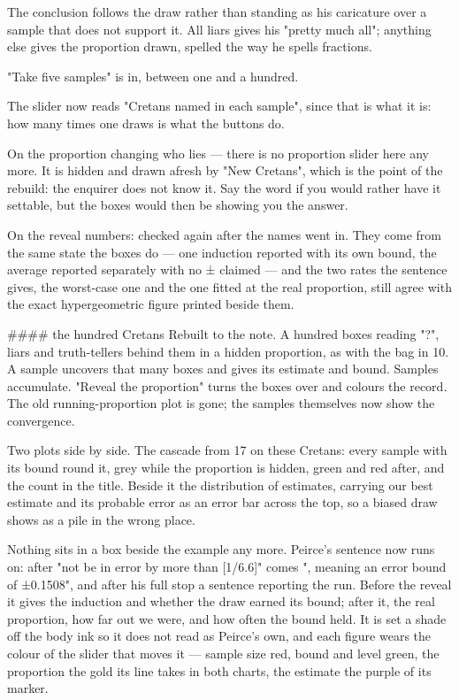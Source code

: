 The conclusion follows the draw rather than standing as his caricature over a
sample that does not support it. All liars gives his "pretty much all"; anything
else gives the proportion drawn, spelled the way he spells fractions.

"Take five samples" is in, between one and a hundred.

The slider now reads "Cretans named in each sample", since that is what it is:
how many times one draws is what the buttons do.

On the proportion changing who lies — there is no proportion slider here any
more. It is hidden and drawn afresh by "New Cretans", which is the point of the
rebuild: the enquirer does not know it. Say the word if you would rather have it
settable, but the boxes would then be showing you the answer.

On the reveal numbers: checked again after the names went in. They come from the
same state the boxes do — one induction reported with its own bound, the average
reported separately with no ± claimed — and the two rates the sentence gives,
the worst-case one and the one fitted at the real proportion, still agree with
the exact hypergeometric figure printed beside them.

#### the hundred Cretans
Rebuilt to the note. A hundred boxes reading "?", liars and truth-tellers behind
them in a hidden proportion, as with the bag in 10. A sample uncovers that many
boxes and gives its estimate and bound. Samples accumulate. "Reveal the
proportion" turns the boxes over and colours the record. The old
running-proportion plot is gone; the samples themselves now show the
convergence.

Two plots side by side. The cascade from 17 on these Cretans: every sample with
its bound round it, grey while the proportion is hidden, green and red after,
and the count in the title. Beside it the distribution of estimates, carrying
our best estimate and its probable error as an error bar across the top, so a
biased draw shows as a pile in the wrong place.

Nothing sits in a box beside the example any more. Peirce's sentence now runs
on: after "not be in error by more than [1/6.6]" comes ", meaning an error bound
of ±0.1508", and after his full stop a sentence reporting the run. Before the
reveal it gives the induction and whether the draw earned its bound; after it,
the real proportion, how far out we were, and how often the bound held. It is
set a shade off the body ink so it does not read as Peirce's own, and each
figure wears the colour of the slider that moves it — sample size red, bound and
level green, the proportion the gold its line takes in both charts, the estimate
the purple of its marker.

